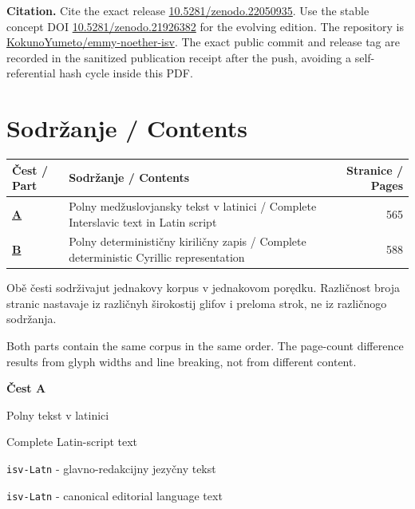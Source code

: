 \documentclass[11pt]{article}
\newcommand{\doiurl}[1]{\href{https://doi.org/#1}{#1}}
\newcommand{\repo}{\href{https://github.com/KokunoYumeto/emmy-noether-isv}{KokunoYumeto/emmy-noether-isv}}
\begin{document}
\textbf{Citation.} Cite the exact release \doiurl{10.5281/zenodo.22050935}. Use the stable concept DOI \doiurl{10.5281/zenodo.21926382} for the evolving edition. The repository is \repo. The exact public commit and release tag are recorded in the sanitized publication receipt after the push, avoiding a self-referential hash cycle inside this PDF.
\clearpage

\section*{Sodržanje / Contents}
\begin{tabularx}{\textwidth}{@{}>{\bfseries}l X r@{}}
\toprule
Čest / Part & Sodržanje / Contents & Stranice / Pages\\
\midrule
\hyperref[part:latn]{A} & Polny medžuslovjansky tekst v latinici / Complete Interslavic text in Latin script & 565\\
\hyperref[part:cyrl]{B} & Polny determinističny kiriličny zapis / Complete deterministic Cyrillic representation & 588\\
\bottomrule
\end{tabularx}

\vspace{1.5em}
Obě česti sodrživajut jednakovy korpus v jednakovom porędku. Različnost broja stranic nastavaje iz različnyh širokostij glifov i preloma strok, ne iz različnogo sodržanja.

Both parts contain the same corpus in the same order. The page-count difference results from glyph widths and line breaking, not from different content.
\clearpage

\label{part:latn}
\thispagestyle{empty}
\begin{center}
\vspace*{5cm}
{\sffamily\color{NoetherBlue}\Huge\bfseries Čest A\par}
\vspace{0.6cm}
{\sffamily\LARGE Polny tekst v latinici\par}
{\sffamily\Large Complete Latin-script text\par}
\vfill
{\large \texttt{isv-Latn} - glavno-redakcijny jezyčny tekst\par}
{\large \texttt{isv-Latn} - canonical editorial language text\par}
\end{center}
\clearpage

\end{document}
